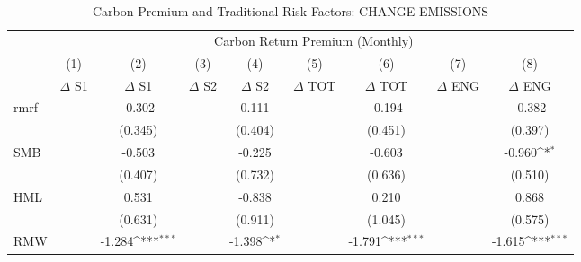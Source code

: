 \begin{table}[htbp]\centering
\def\sym#1{\ifmmode^{#1}\else\(^{#1}\)\fi}
\caption{Carbon Premium and Traditional Risk Factors: CHANGE EMISSIONS}
\begin{tabular}{l*{8}{c}}
\hline\hline
                    &\multicolumn{8}{c}{Carbon Return Premium (Monthly)}                                                                                                                            \\\cmidrule(lr){2-9}
                    &\multicolumn{1}{c}{(1)}&\multicolumn{1}{c}{(2)}&\multicolumn{1}{c}{(3)}&\multicolumn{1}{c}{(4)}&\multicolumn{1}{c}{(5)}&\multicolumn{1}{c}{(6)}&\multicolumn{1}{c}{(7)}&\multicolumn{1}{c}{(8)}\\
                    &\multicolumn{1}{c}{$\Delta$ S1}&\multicolumn{1}{c}{$\Delta$ S1}&\multicolumn{1}{c}{$\Delta$ S2}&\multicolumn{1}{c}{$\Delta$ S2}&\multicolumn{1}{c}{$\Delta$ TOT}&\multicolumn{1}{c}{$\Delta$ TOT}&\multicolumn{1}{c}{$\Delta$ ENG}&\multicolumn{1}{c}{$\Delta$ ENG}\\
\hline
rmrf                &                     &      -0.302         &                     &       0.111         &                     &      -0.194         &                     &      -0.382         \\
                    &                     &     (0.345)         &                     &     (0.404)         &                     &     (0.451)         &                     &     (0.397)         \\
SMB                 &                     &      -0.503         &                     &      -0.225         &                     &      -0.603         &                     &      -0.960\sym{*}  \\
                    &                     &     (0.407)         &                     &     (0.732)         &                     &     (0.636)         &                     &     (0.510)         \\
HML                 &                     &       0.531         &                     &      -0.838         &                     &       0.210         &                     &       0.868         \\
                    &                     &     (0.631)         &                     &     (0.911)         &                     &     (1.045)         &                     &     (0.575)         \\
RMW                 &                     &      -1.284\sym{***}&                     &      -1.398\sym{*}  &                     &      -1.791\sym{***}&                     &      -1.615\sym{***}\\

\end{tabular}
\end{table}
